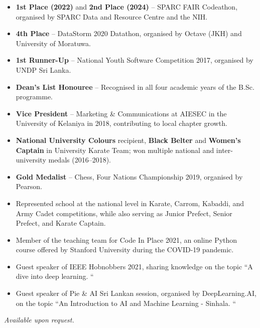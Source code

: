 \documentclass[12pt,a4paper,withhyper]{altacv}
\begin{document}
\medskip

\begin{itemize}
    \item \textbf{1st Place (2022)} and \textbf{2nd Place (2024)} – SPARC FAIR Codeathon, organised by SPARC Data and Resource Centre and the NIH.
    \item \textbf{4th Place} – DataStorm 2020 Datathon, organised by Octave (JKH) and University of Moratuwa.
    \item \textbf{1st Runner-Up} – National Youth Software Competition 2017, organised by UNDP Sri Lanka.
    \item \textbf{Dean’s List Honouree} – Recognised in all four academic years of the B.Sc. programme.

    \item \textbf{Vice President} – Marketing \& Communications at AIESEC in the University of Kelaniya in 2018, contributing to local chapter growth.

    \item \textbf{National University Colours} recipient, \textbf{Black Belter} and \textbf{Women's Captain} in University Karate Team; won multiple national and inter-university medals (2016–2018).

    \item \textbf{Gold Medalist} – Chess, Four Nations Championship 2019, organised by Pearson.
    \item Represented school at the national level in Karate, Carrom, Kabaddi, and Army Cadet competitions, while also serving as Junior Prefect, Senior Prefect, and Karate Captain.

\end{itemize}



\medskip

\begin{itemize}
    \item Member of the teaching team for Code In Place 2021, an online Python course offered by Stanford University during the COVID-19 pandemic. 
    \item Guest speaker of IEEE Hobnobbers 2021, sharing knowledge on the topic ``A dive into deep learning. ``
    \item Guest speaker of Pie \& AI Sri Lankan session, organised by DeepLearning.AI, on the topic ``An Introduction to AI and Machine Learning - Sinhala. ``
\end{itemize}

\medskip



\medskip
{}
\textit{Available upon request.}

\end{document}
